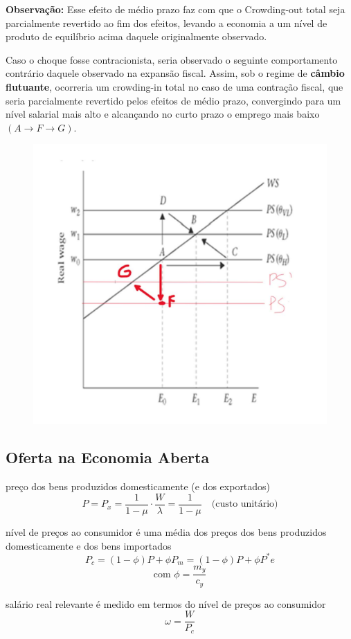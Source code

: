 \documentclass[a4paper,12pt]{article}[abntex2]
\begin{document}
\textbf{Observação:} Esse efeito de médio prazo faz com que o Crowding-out total seja parcialmente revertido ao fim dos efeitos, levando a economia a um nível de produto de equilíbrio acima daquele originalmente observado.

Caso o choque fosse contracionista, seria observado o seguinte comportamento contrário daquele observado na expansão fiscal. Assim, sob o regime de \textbf{câmbio flutuante}, ocorreria um crowding-in total no caso de uma contração fiscal, que seria parcialmente revertido pelos efeitos de médio prazo, convergindo para um nível salarial mais alto e alcançando no curto prazo o emprego mais baixo 
$(A \rightarrow F \rightarrow G)$.

\begin{figure}[H]
    \centering
    \includegraphics[width=0.7\linewidth]{Imagens/a25i4.png}
\end{figure}

\subsection{\textbf{Oferta na Economia Aberta}}
preço dos bens produzidos domesticamente (e dos exportados)
\[
P = P_x = \frac{1}{1 - \mu} \cdot \frac{W}{\lambda} = \frac{1}{1 - \mu} \quad \text{(custo unitário)}
\]

nível de preços ao consumidor é uma média dos preços dos bens produzidos domesticamente e dos bens importados
\[
P_c = (1 - \phi)P + \phi P_m = (1 - \phi)P + \phi P^* e
\]
\[
\text{com } \phi = \frac{m_y}{c_y}
\]

salário real relevante é medido em termos do nível de preços ao consumidor
\[
\omega = \frac{W}{P_c}
\]
\end{document}

